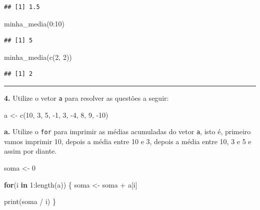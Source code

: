 \documentclass[
]{book}
\newenvironment{Shaded}{\begin{snugshade}}{\end{snugshade}}
\newcommand{\ControlFlowTok}[1]{\textcolor[rgb]{0.13,0.29,0.53}{\textbf{#1}}}
\newcommand{\DecValTok}[1]{\textcolor[rgb]{0.00,0.00,0.81}{#1}}
\newcommand{\FunctionTok}[1]{\textcolor[rgb]{0.00,0.00,0.00}{#1}}
\newcommand{\NormalTok}[1]{#1}
\newcommand{\OtherTok}[1]{\textcolor[rgb]{0.56,0.35,0.01}{#1}}
\newcommand{\SpecialCharTok}[1]{\textcolor[rgb]{0.00,0.00,0.00}{#1}}
\begin{document}
\begin{verbatim}
## [1] 1.5
\end{verbatim}

\begin{Shaded}
\begin{Highlighting}[]
\FunctionTok{minha\_media}\NormalTok{(}\DecValTok{0}\SpecialCharTok{:}\DecValTok{10}\NormalTok{)}
\end{Highlighting}
\end{Shaded}

\begin{verbatim}
## [1] 5
\end{verbatim}

\begin{Shaded}
\begin{Highlighting}[]
\FunctionTok{minha\_media}\NormalTok{(}\FunctionTok{c}\NormalTok{(}\DecValTok{2}\NormalTok{, }\DecValTok{2}\NormalTok{))}
\end{Highlighting}
\end{Shaded}

\begin{verbatim}
## [1] 2
\end{verbatim}

\begin{center}\rule{0.5\linewidth}{0.5pt}\end{center}

\textbf{4.} Utilize o vetor \texttt{a} para resolver as questões a seguir:

\begin{Shaded}
\begin{Highlighting}[]
\NormalTok{a }\OtherTok{\textless{}{-}} \FunctionTok{c}\NormalTok{(}\DecValTok{10}\NormalTok{, }\DecValTok{3}\NormalTok{, }\DecValTok{5}\NormalTok{, }\SpecialCharTok{{-}}\DecValTok{1}\NormalTok{, }\DecValTok{3}\NormalTok{, }\SpecialCharTok{{-}}\DecValTok{4}\NormalTok{, }\DecValTok{8}\NormalTok{, }\DecValTok{9}\NormalTok{, }\SpecialCharTok{{-}}\DecValTok{10}\NormalTok{)}
\end{Highlighting}
\end{Shaded}

\textbf{a.} Utilize o \texttt{for} para imprimir as médias acumuladas do vetor \texttt{a}, isto é, primeiro vamos imprimir 10, depois a média entre 10 e 3, depois a média entre 10, 3 e 5 e assim por diante.

\begin{Shaded}
\begin{Highlighting}[]
\NormalTok{soma }\OtherTok{\textless{}{-}} \DecValTok{0}

\ControlFlowTok{for}\NormalTok{(i }\ControlFlowTok{in} \DecValTok{1}\SpecialCharTok{:}\FunctionTok{length}\NormalTok{(a)) \{}
\NormalTok{  soma }\OtherTok{\textless{}{-}}\NormalTok{ soma }\SpecialCharTok{+}\NormalTok{ a[i]}
  
  \FunctionTok{print}\NormalTok{(soma }\SpecialCharTok{/}\NormalTok{ i)}
\NormalTok{\}}
\end{Highlighting}
\end{Shaded}
\end{document}
